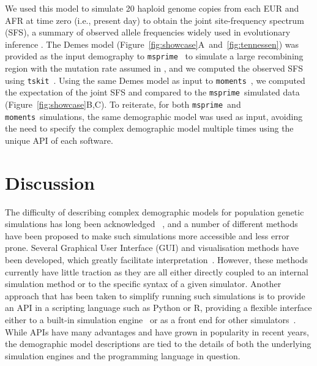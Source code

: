 \documentclass[11pt]{article}
\newcommand{\msprime}[0]{\texttt{msprime}}
\newcommand{\moments}[0]{\texttt{moments}}
\newcommand{\tskit}[0]{\texttt{tskit}}
\begin{document}
We used this model to simulate 20 haploid genome copies from each EUR and AFR
at time zero (i.e., present day) to obtain the joint site-frequency spectrum
(SFS), a summary of observed allele frequencies widely used in evolutionary
inference
\citep{bustamante2001directional,gutenkunst2009inferring,tennessen2012evolution,jouganous2017inferring,kamm2017efficient,kim2017inference}.
The Demes model (Figure~\ref{fig:showcase}A~and~\ref{fig:tennessen}) was
provided as the input demography to \msprime\ \citep{baumdicker2021-iu} to
simulate a large recombining region with the mutation rate assumed in
\citet{tennessen2012evolution}, and we computed the observed SFS using \tskit\
\citep{ralph2020efficiently}. Using the same Demes model as input to \moments\
\citep{jouganous2017inferring}, we computed the expectation of the joint SFS
and compared to the \msprime\ simulated data (Figure~\ref{fig:showcase}B,C).
To reiterate, for both \msprime\ and \moments\ simulations, the same
demographic model was used as input, avoiding the need to specify the complex
demographic model multiple times using the unique API of each software.

\section*{Discussion}

The difficulty of describing complex demographic models
for population genetic simulations has long been acknowledged
~\citep[][e.g.]{antao2007modeler4simcoal2}, %
and a number of different methods have been proposed to
make such simulations more accessible and less error prone.
Several Graphical User Interface (GUI) and visualisation
methods have been developed, which greatly facilitate
interpretation~\citep{mailund2005coasim,antao2007modeler4simcoal2,
ewing2010msms,zhou2018popdemog}. However, these methods
currently have little traction as they are all either directly coupled
to an internal simulation method or to the specific syntax
of a given simulator. Another approach that has been taken to
simplify running such simulations is to provide an API in a
scripting language such as Python or R, providing a flexible
interface either to a built-in simulation
engine~\citep{thornton2014cpp,thornton2019-nu,baumdicker2021-iu,kelleher2016efficient,haller2017flexible}
or as a front end for other simulators~\citep{staab2016coala}.
While APIs have many advantages and have grown in popularity in
recent years, the demographic model descriptions are tied
to the details of both the underlying simulation engines
and the programming language in question.
\end{document}
